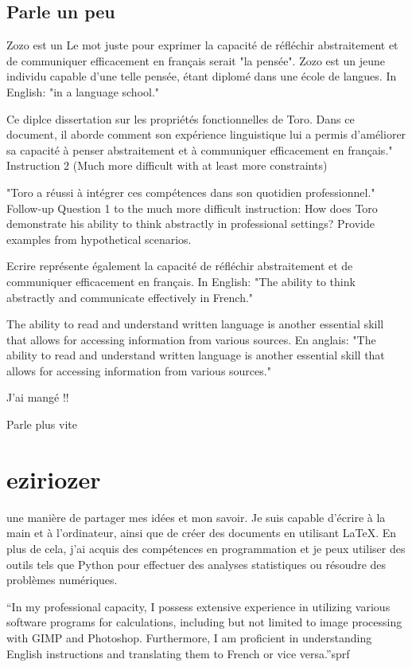 \documentclass{article}
\begin{document}
\subsection{Parle un peu}

Zozo est un Le mot juste pour exprimer la capacité de réfléchir abstraitement et de communiquer efficacement en français serait "la pensée". Zozo est un jeune individu capable d'une telle pensée, étant diplomé dans une école de langues. In English: "in a language school."

Ce diplce dissertation sur les propriétés fonctionnelles de Toro. Dans ce document, il aborde comment son expérience linguistique lui a permis d'améliorer sa capacité à penser abstraitement et à communiquer efficacement en français." Instruction 2 (Much more difficult with at least more constraints)

"Toro a réussi à intégrer ces compétences dans son quotidien professionnel." Follow-up Question 1 to the much more difficult instruction: How does Toro demonstrate his ability to think abstractly in professional settings? Provide examples from hypothetical scenarios.



Ecrire représente également la capacité de réfléchir abstraitement et de communiquer efficacement en français. In English: "The ability to think abstractly and communicate effectively in French."

The ability to read and understand written language is another essential skill that allows for accessing information from various sources. En anglais: "The ability to read and understand written language is another essential skill that allows for accessing information from various sources."

J'ai mangé !! 

Parle plus vite


\section{eziriozer}

une manière de partager mes idées et mon savoir. Je suis capable d'écrire à la main et à l'ordinateur, ainsi que de créer des documents en utilisant LaTeX. En plus de cela, j'ai acquis des compétences en programmation et je peux utiliser des outils tels que Python pour effectuer des analyses statistiques ou résoudre des problèmes numériques.


 ``In my professional capacity, I possess extensive experience in utilizing various software programs for calculations, including but not limited to image processing with GIMP and Photoshop. Furthermore, I am proficient in understanding English instructions and translating them to French or vice versa.''sprf
\end{document}

